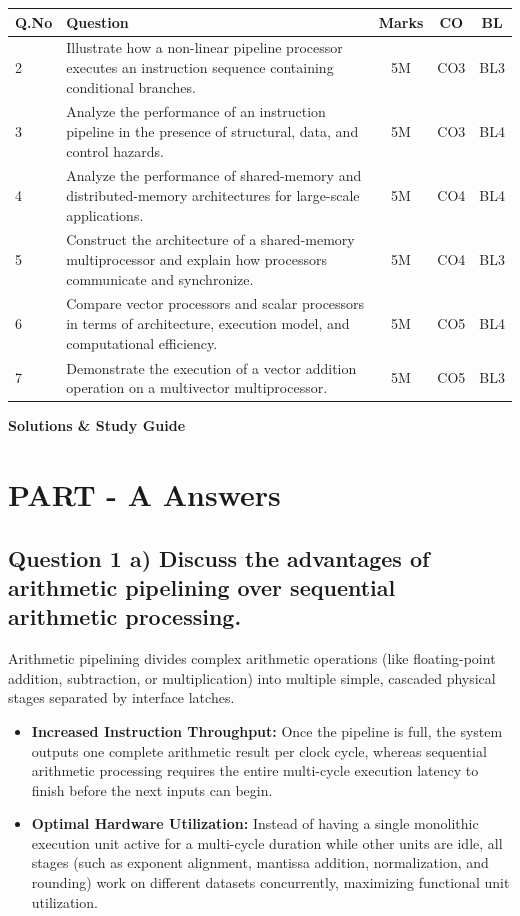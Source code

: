\documentclass[11pt, a4paper]{article}
\begin{document}
\begin{table}[htbp]
    \centering
    \begin{tabular}{lp{10cm}ccc}
        \toprule
        Q.No & Question & Marks & CO & BL \\
        \midrule
        2 & Illustrate how a non-linear pipeline processor executes an instruction sequence containing conditional branches. & 5M & CO3 & BL3 \\
        3 & Analyze the performance of an instruction pipeline in the presence of structural, data, and control hazards. & 5M & CO3 & BL4 \\
        4 & Analyze the performance of shared-memory and distributed-memory architectures for large-scale applications. & 5M & CO4 & BL4 \\
        5 & Construct the architecture of a shared-memory multiprocessor and explain how processors communicate and synchronize. & 5M & CO4 & BL3 \\
        6 & Compare vector processors and scalar processors in terms of architecture, execution model, and computational efficiency. & 5M & CO5 & BL4 \\
        7 & Demonstrate the execution of a vector addition operation on a multivector multiprocessor. & 5M & CO5 & BL3 \\
        \bottomrule
    \end{tabular}
\end{table}

\newpage
\begin{center}
    \large\bfseries Solutions \& Study Guide
\end{center}
\vspace{0.4cm}

\section*{PART - A Answers}

\subsection*{Question 1 a) Discuss the advantages of arithmetic pipelining over sequential arithmetic processing.}
Arithmetic pipelining divides complex arithmetic operations (like floating-point addition, subtraction, or multiplication) into multiple simple, cascaded physical stages separated by interface latches.
\begin{itemize}
    \item \textbf{Increased Instruction Throughput:} Once the pipeline is full, the system outputs one complete arithmetic result per clock cycle, whereas sequential arithmetic processing requires the entire multi-cycle execution latency to finish before the next inputs can begin.
    \item \textbf{Optimal Hardware Utilization:} Instead of having a single monolithic execution unit active for a multi-cycle duration while other units are idle, all stages (such as exponent alignment, mantissa addition, normalization, and rounding) work on different datasets concurrently, maximizing functional unit utilization.
\end{itemize}
\end{document}

